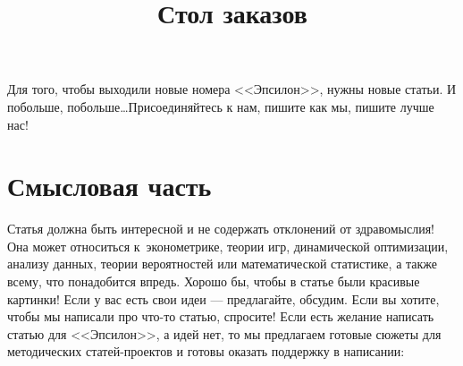 \documentclass[final,pdftex]{../../template/epsilonj}
\begin{document}
\setcounter{page}{59}

\begin{frontmatter}
\title{Стол заказов}

\begin{aug}
\author{ }%



\end{aug}



\end{frontmatter}





Для того, чтобы выходили новые номера <<Эпсилон>>, нужны новые статьи. И побольше, побольше\ldots Присоединяйтесь к нам, пишите как мы, пишите лучше нас!




\section{Смысловая часть}

Статья должна быть интересной и не содержать отклонений от здравомыслия! Она может относиться к~эконометрике, теории игр, динамической оптимизации, анализу данных, теории вероятностей или математической статистике, а также всему, что понадобится впредь. Хорошо бы, чтобы в статье были красивые картинки! Если у вас есть свои идеи --- предлагайте, обсудим. Если вы хотите, чтобы мы написали про что-то статью, спросите! Если есть желание написать статью для <<Эпсилон>>, а идей нет, то мы предлагаем готовые сюжеты для методических статей-проектов и готовы оказать поддержку в написании:
\end{document}
